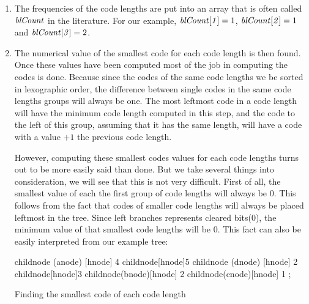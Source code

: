 \begin{enumerate}
\item The frequencies of the code lengths are put into an array that
  is often called $\mathit{blCount}$ in the  literature. For our
  example, $\mathit{blCount[1]} = 1$, $\mathit{blCount[2]} = 1$ and
  $\mathit{blCount[3]} = 2$.

\item The numerical value of the smallest code for each code length is then
  found. Once these values have been computed most of the job in
  computing the codes is done. Because since the codes of the same
  code lengths we be sorted in lexographic order, the difference
  between single codes in the same code lengths groups will always be
  one. The most leftmost code in a code length will have the minimum
  code length computed in this step, and the code to the left of this
  group, assuming that it has the same length, will have a code with a
  value $+1$ the previous code length.

  However, computing these smallest codes values for each code lengths
  turns out to be more easily said than done. But we take several
  things into consideration, we will see that this is not very
  difficult. First of all, the smallest value of each the first group
  of code lengths will always be $0$. This follows from the fact that
  codes of smaller code lengths will always be placed leftmost in the
  tree. Since left branches represents cleared bits($0$), the minimum
  value of that smallest code lengths will be $0$. This fact can also
  be easily interpreted from our example tree:

\begin{huffmanc}
  child{node (anode) [hnode] {4}}
  child{node[hnode]{5}
    child{node (dnode) [hnode] {2}}
    child{node[hnode]{3}
      child{node(bnode)[hnode] {2}}
      child{node(cnode)[hnode] {1}}
    }};

\end{huffmanc}


  \begin{algorithm}[H]
    \caption{Finding the smallest code of each code length}\algohack{}    \label{alg:smallest-code-length}
    \begin{algorithmic}[1]
      \EndForTo
    \end{algorithmic}
  \end{algorithm}


\end{enumerate}
